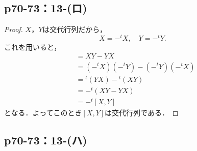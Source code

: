 \documentclass[a4paper,10pt,fleqn]{ltjsarticle}
\begin{document}
\subsection*{p70-73：13-(ロ)}

\begin{tleftbar}
    \begin{proof}
        $X$，$Y$は交代行列だから，
        \[
            X=- {}^t X ,\quad Y = -{}^t Y .
        \]
        これを用いると，
        \begin{align*}
            [X,Y] & = XY -YX                                   \\
                  & = (-{}^t X) (-{}^t Y) - (-{}^t Y)(-{}^t X) \\
                  & = {}^t (YX) - {}^t (XY)                    \\
                  & = -{}^t (XY-YX)                            \\
                  & = -{}^t [X,Y]
        \end{align*}
        となる．よってこのとき$[X,Y]$は交代行列である．
    \end{proof}
\end{tleftbar}

\newpage

\subsection*{p70-73：13-(ハ)}
\end{document}
